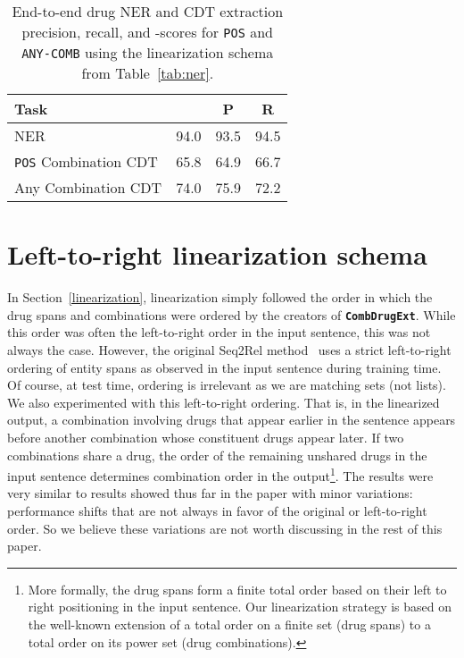 \documentclass[conference]{IEEEtran}
\begin{document}
\begin{table}[h]
\centering
 \renewcommand{\arraystretch}{1.3}
 \caption{End-to-end drug NER and CDT extraction precision, recall, and -scores for \texttt{POS} and \texttt{ANY-COMB} using the linearization schema from Table~\ref{tab:ner}. }
\label{tb:nerf1}
\begin{tabular}{lccc}
\toprule
Task &  & P & R\\\midrule
NER  & 94.0 & 93.5 & 94.5 \\\midrule
 \texttt{POS} Combination CDT & 65.8 & 64.9 & 66.7 \\
 Any Combination CDT & 74.0 & 75.9 & 72.2\\
\bottomrule
\end{tabular}


\end{table}

\section{Left-to-right linearization schema}
\label{sec-left-to-right}
In Section~\ref{linearization}, linearization simply followed the order in which the drug spans and combinations were ordered by the creators of \textbf{\texttt{CombDrugExt}}. While this order was often the left-to-right order in the input sentence, this was not always the case.  However, the original Seq2Rel method~\cite{giorgi-etal-2022-sequence} uses a strict left-to-right ordering of entity spans as observed in the input sentence during training time. Of course, at test time, ordering is irrelevant as we are matching sets (not lists). We also experimented with this left-to-right ordering.  
That is, in the linearized output, a combination involving drugs that appear  earlier in the sentence appears before another combination whose constituent drugs appear later. If two combinations share a drug, the order of the remaining unshared drugs in the input sentence determines combination order in the output\footnote{More formally, the drug spans form a finite total order based on their left to right positioning in the input sentence. Our linearization strategy is based on the well-known extension of a total order on a finite set (drug spans) to a total order on its power set (drug combinations).}. The results were very similar to results showed thus far in the paper with minor variations:   performance shifts that are not always in favor of the original or left-to-right order. So we believe these variations are not worth discussing in the rest of this paper.  
\end{document}
